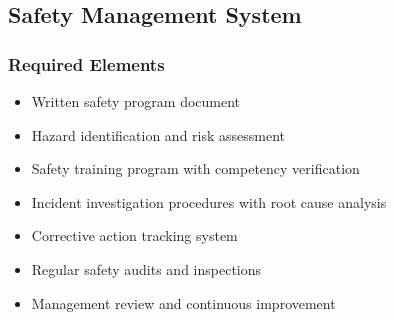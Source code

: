\subsection{Safety Management System}

\subsubsection{Required Elements}
\begin{itemize}[noitemsep]
    \item Written safety program document
    \item Hazard identification and risk assessment
    \item Safety training program with competency verification
    \item Incident investigation procedures with root cause analysis
    \item Corrective action tracking system
    \item Regular safety audits and inspections
    \item Management review and continuous improvement
\end{itemize}